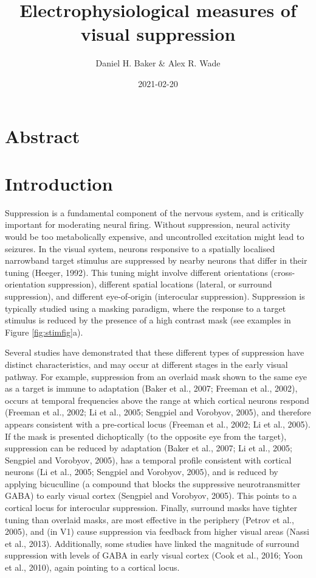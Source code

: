 \documentclass[]{article}
\title{Electrophysiological measures of visual suppression}
\author{Daniel H. Baker \& Alex R. Wade}
\date{2021-02-20}
\begin{document}
\maketitle

\hypertarget{abstract}{%
\section{Abstract}\label{abstract}}

\hypertarget{introduction}{%
\section{Introduction}\label{introduction}}

Suppression is a fundamental component of the nervous system, and is critically important for moderating neural firing. Without suppression, neural activity would be too metabolically expensive, and uncontrolled excitation might lead to seizures. In the visual system, neurons responsive to a spatially localised narrowband target stimulus are suppressed by nearby neurons that differ in their tuning (Heeger, 1992). This tuning might involve different orientations (cross-orientation suppression), different spatial locations (lateral, or surround suppression), and different eye-of-origin (interocular suppression). Suppression is typically studied using a masking paradigm, where the response to a target stimulus is reduced by the presence of a high contrast mask (see examples in Figure \ref{fig:stimfig}a).

Several studies have demonstrated that these different types of suppression have distinct characteristics, and may occur at different stages in the early visual pathway. For example, suppression from an overlaid mask shown to the same eye as a target is immune to adaptation (Baker et al., 2007; Freeman et al., 2002), occurs at temporal frequencies above the range at which cortical neurons respond (Freeman et al., 2002; Li et al., 2005; Sengpiel and Vorobyov, 2005), and therefore appears consistent with a pre-cortical locus (Freeman et al., 2002; Li et al., 2005). If the mask is presented dichoptically (to the opposite eye from the target), suppression can be reduced by adaptation (Baker et al., 2007; Li et al., 2005; Sengpiel and Vorobyov, 2005), has a temporal profile consistent with cortical neurons (Li et al., 2005; Sengpiel and Vorobyov, 2005), and is reduced by applying bicuculline (a compound that blocks the suppressive neurotransmitter GABA) to early visual cortex (Sengpiel and Vorobyov, 2005). This points to a cortical locus for interocular suppression. Finally, surround masks have tighter tuning than overlaid masks, are most effective in the periphery (Petrov et al., 2005), and (in V1) cause suppression via feedback from higher visual areas (Nassi et al., 2013). Additionally, some studies have linked the magnitude of surround suppression with levels of GABA in early visual cortex (Cook et al., 2016; Yoon et al., 2010), again pointing to a cortical locus.
\end{document}
